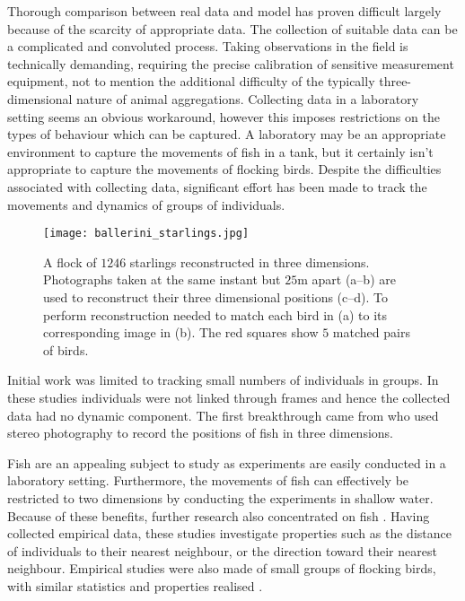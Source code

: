 Thorough comparison between real data and model has proven difficult largely because of the scarcity of appropriate data. The collection of suitable data can be a complicated and convoluted process. Taking observations in the field is technically demanding, requiring the precise calibration of sensitive measurement equipment, not to mention the additional difficulty of the typically three-dimensional nature of animal aggregations. Collecting data in a laboratory setting seems an obvious workaround, however this imposes restrictions on the types of behaviour which can be captured. A laboratory may be an appropriate environment to capture the movements of fish in a tank, but it certainly isn't appropriate to capture the movements of flocking birds. Despite the difficulties associated with collecting data, significant effort has been made to track the movements and dynamics of groups of individuals.

\begin{figure}[t]
	\texttt{[image: ballerini\_starlings.jpg]}
	\caption{A flock of $1246$ starlings reconstructed in three dimensions. Photographs taken at the same instant but $25$m apart (a--b) are used to reconstruct their three dimensional positions (c--d). To perform reconstruction \citet{ballerini08} needed to match each bird in (a) to its corresponding image in (b). The red squares show $5$ matched pairs of birds.}
	\label{fig:ballerini}
\end{figure}

Initial work was limited to tracking small numbers of individuals in groups. In these studies individuals were not linked through frames and hence the collected data had no dynamic component. The first breakthrough came from \citet{cullen65} who used stereo photography to record the positions of fish in three dimensions.

Fish are an appealing subject to study as experiments are easily conducted in a laboratory setting. Furthermore, the movements of fish can effectively be restricted to two dimensions by conducting the experiments in shallow water. Because of these benefits, further research also concentrated on fish \citep{partridge80, van_long85}. Having collected empirical data, these studies investigate properties such as the distance of individuals to their nearest neighbour, or the direction toward their nearest neighbour. Empirical studies were also made of small groups of flocking birds, with similar statistics and properties realised \citep{major78, budgey98}.

